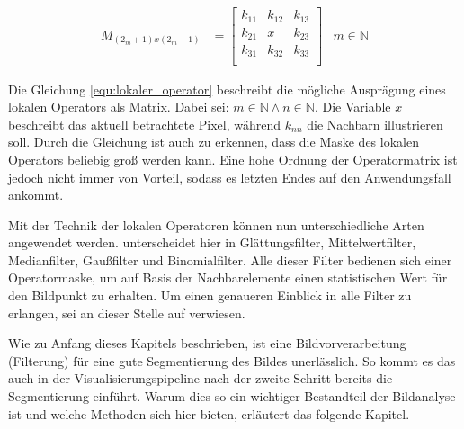 \begin{align}
	\label{equ:lokaler_operator}M_{(2_m+1)x(2_m+1)} & = \begin{bmatrix}k_{11}&k_{12}&k_{13}\\ k_{21}&x&k_{23}\\ k_{31}&k_{32}&k_{33}\\\end{bmatrix} & m \in \mathbb{N}
\end{align}

Die Gleichung \ref{equ:lokaler_operator} beschreibt die mögliche Ausprägung eines
lokalen Operators als Matrix. Dabei sei: $m \in \mathbb{N}\wedge n \in \mathbb{N}$.
Die Variable $x$ beschreibt das aktuell betrachtete Pixel, während $k_{nn}$ die Nachbarn
illustrieren soll. Durch die Gleichung ist auch zu erkennen, dass die Maske des lokalen
Operators beliebig groß werden kann. Eine hohe Ordnung der Operatormatrix ist
jedoch nicht immer von Vorteil, sodass es letzten Endes auf den Anwendungsfall ankommt.

Mit der Technik der lokalen Operatoren können nun unterschiedliche Arten angewendet
werden. \citet[S.~54 - 55]{handels2000} unterscheidet hier in Glättungsfilter,
Mittelwertfilter, Medianfilter, Gaußfilter und Binomialfilter. Alle dieser Filter
bedienen sich einer Operatormaske, um auf Basis der Nachbarelemente einen
statistischen Wert für den Bildpunkt zu erhalten. Um einen genaueren Einblick in
alle Filter zu erlangen, sei an dieser Stelle auf \citet[S.~54 - 55]{handels2000}
verwiesen.

Wie zu Anfang dieses Kapitels beschrieben, ist eine Bildvorverarbeitung (Filterung)
für eine gute Segmentierung des Bildes unerlässlich. So kommt es das auch in der
Visualisierungspipeline nach \citet[S.~50]{handels2000} der zweite Schritt
bereits die Segmentierung einführt. Warum dies so ein wichtiger Bestandteil der Bildanalyse
ist und welche Methoden sich hier bieten, erläutert das folgende Kapitel.

\pagebreak

